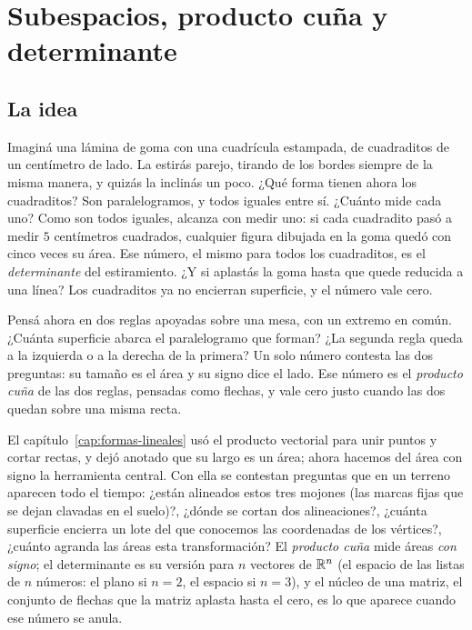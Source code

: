 \chapter{Subespacios, producto cuña y determinante}\label{cap:subespacios}\label{sec:bloque-algebraico}

\section{La idea}

Imaginá una lámina de goma con una cuadrícula estampada, de cuadraditos de un centímetro de
lado. La estirás parejo, tirando de los bordes siempre de la misma manera, y quizás la
inclinás un poco. ¿Qué forma tienen ahora los cuadraditos?
Son paralelogramos, y todos iguales entre sí. ¿Cuánto mide cada uno?
Como son todos iguales, alcanza con medir uno: si cada cuadradito pasó a medir \(5\)
centímetros cuadrados, cualquier figura dibujada en la goma quedó con cinco veces su área.
Ese número, el mismo para todos los cuadraditos, es el \emph{determinante} del estiramiento.
¿Y si aplastás la goma hasta que quede reducida a una línea?
Los cuadraditos ya no encierran superficie, y el número vale cero.

Pensá ahora en dos reglas apoyadas sobre una mesa, con un extremo en común. ¿Cuánta superficie
abarca el paralelogramo que forman? ¿La segunda regla queda a la izquierda o a la derecha de la
primera?
Un solo número contesta las dos preguntas: su tamaño es el área y su signo dice el lado.
Ese número es el \emph{producto cuña} de las dos reglas, pensadas como flechas, y vale cero
justo cuando las dos quedan sobre una misma recta.

El capítulo~\ref{cap:formas-lineales} usó el producto vectorial para unir puntos y cortar
rectas, y dejó anotado que su largo es un área; ahora hacemos del área con signo la
herramienta central. Con ella se contestan preguntas que en un terreno aparecen todo el
tiempo:
¿están alineados estos tres mojones (las marcas fijas que se dejan clavadas en el suelo)?,
¿dónde se cortan dos alineaciones?, ¿cuánta superficie encierra un lote del que conocemos
las coordenadas de los vértices?, ¿cuánto agranda las áreas esta transformación? El
\emph{producto cuña} mide áreas \emph{con signo}; el determinante es su versión para \(n\)
vectores de \(\mathbb{R}^n\) (el espacio de las listas de \(n\) números: el plano si \(n=2\), el
espacio si \(n=3\)), y el núcleo de una matriz, el conjunto de flechas que la matriz aplasta
hasta el cero, es lo que aparece cuando ese número se anula.

